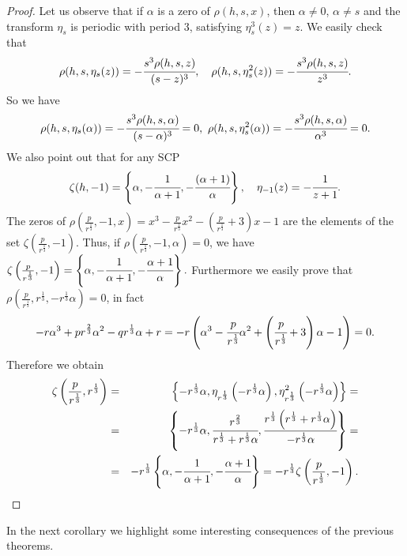 \documentclass[12pt,reqno]{article}
\begin{document}
\begin{proof}
Let us observe that if $\alpha$ is a zero of $\rho(h,s,x)$, then $\alpha\not=0$, $\alpha\not=s$  and the transform $\eta_s$ is periodic with period 3, satisfying $\eta_s^3(z)=z$. We easily check that
$$\rho(h,s,\eta_s(z))=-\cfrac{s^3\rho(h,s,z)}{(s-z)^3},\quad \rho(h,s,\eta_s^2(z))=-\cfrac{s^3\rho(h,s,z)}{z^3}.$$
So we have
$$\rho(h,s,\eta_s(\alpha))=-\cfrac{s^3\rho(h,s,\alpha)}{(s-\alpha)^3}=0,\  \rho(h,s,\eta_s^2(\alpha))=-\cfrac{s^3\rho(h,s,\alpha)}{\alpha^3}=0.$$
We also point out that for any SCP 
$$\zeta(h,-1)=\left\{\alpha,-\cfrac{1}{\alpha + 1},-\cfrac{(\alpha + 1)}{\alpha}\right\} ,\quad \eta_{-1}(z)=-\cfrac{1}{z + 1}.$$
The zeros of $\rho\left(\frac{p}{r^{\frac{1}{3}}},-1,x\right)=x^3-\frac{p}{r^{\frac{1}{3}}}x^2-\left(\frac{p}{r^{\frac{1}{3}}}+3\right)x-1$ are the elements of the set $\zeta\left(\frac{p}{r^{\frac{1}{3}}},-1\right)$. Thus, if  $\rho\left(\frac{p}{r^{\frac{1}{3}}},-1,\alpha\right)=0$, we have
$\zeta\left(\frac{p}{r^{\frac{1}{3}}},-1\right)=\left\{\alpha,-\cfrac{1}{\alpha+1},-\cfrac{\alpha+1}{\alpha}\right\}.$
Furthermore we easily prove that $\rho\left(\frac{p}{r^{\frac{1}{3}}},r^{\frac{1}{3}},-r^{\frac{1}{3}}\alpha\right)=0$, in fact
$$-r\alpha^3+pr^{\frac{2}{3}}\alpha^2-qr^{\frac{1}{3}}\alpha+r=-r\left(\alpha^3-\cfrac{p}{r^{\frac{1}{3}}}\alpha^2+\left(\cfrac{p}{r^{\frac{1}{3}}}+3\right)\alpha-1\right)=0.$$
Therefore we obtain
\begin{eqnarray*}
\zeta\left(\frac{p}{r^{\frac{1}{3}}},r^{\frac{1}{3}}\right)&=&\left\lbrace-r^{\frac{1}{3}}\alpha,\eta_{r^{\frac{1}{3}}}\left(-r^{\frac{1}{3}}\alpha\right),\eta_{r^{\frac{1}{3}}}^2\left(-r^{\frac{1}{3}}\alpha\right)\right\rbrace=\\
 &=&\left\{-r^{\frac{1}{3}}\alpha,\cfrac{r^{\frac{2}{3}}}{r^{\frac{1}{3}}+r^{\frac{1}{3}}\alpha},\cfrac{r^{\frac{1}{3}}\left(r^{\frac{1}{3}}+r^{\frac{1}{3}}\alpha\right)}{-r^{\frac{1}{3}}\alpha}\right\}=\\
 &=&-r^{\frac{1}{3}}\left\{\alpha,-\cfrac{1}{\alpha+1},-\cfrac{\alpha+1}{\alpha}\right\}=-r^{\frac{1}{3}}\zeta\left(\frac{p}{r^{\frac{1}{3}}},-1\right).
\end{eqnarray*}
\end{proof}
In the next corollary we highlight some interesting consequences of the previous theorems.
\end{document}
